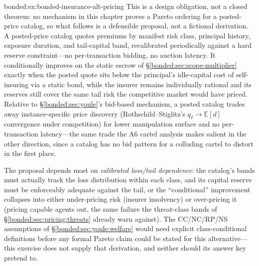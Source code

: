 \begin{pdSolution}{bonded:ex:bonded-insurance-alt-pricing}
This is a design obligation, not a closed theorem: no mechanism in this chapter proves a Pareto ordering for a posted-price catalog, so what follows is a defensible proposal, not a fictional derivation. A posted-price catalog quotes premiums by manifest risk class, principal history, exposure duration, and tail-capital band, recalibrated periodically against a hard reserve constraint---no per-transaction bidding, no auction latency. It conditionally improves on the static escrow of \S\ref{bonded:sec:scope-multiplier} exactly when the posted quote sits below the principal's idle-capital cost of self-insuring via a static bond, while the insurer remains individually rational and its reserves still cover the same tail risk the competitive market would have priced. Relative to \S\ref{bonded:sec:youle}'s bid-based mechanism, a posted catalog trades away instance-specific price discovery (Rothschild--Stiglitz's $q_I \to \mathbb{E}[d]$ convergence under competition) for lower manipulation surface and no per-transaction latency---the same trade the A6 cartel analysis makes salient in the other direction, since a catalog has no bid pattern for a colluding cartel to distort in the first place.

The proposal depends most on \emph{calibrated loss/tail dependence}: the catalog's bands must actually track the loss distribution within each class, and its capital reserve must be enforceably adequate against the tail, or the ``conditional'' improvement collapses into either under-pricing risk (insurer insolvency) or over-pricing it (pricing capable agents out, the same failure the threat-class bands of \S\ref{bonded:sec:pricing:threats} already warn against). The CC/NC/RP/NS assumptions of \S\ref{bonded:sec:youle:welfare} would need explicit class-conditional definitions before any formal Pareto claim could be stated for this alternative---this exercise does not supply that derivation, and neither should its answer key pretend to.
\end{pdSolution}
